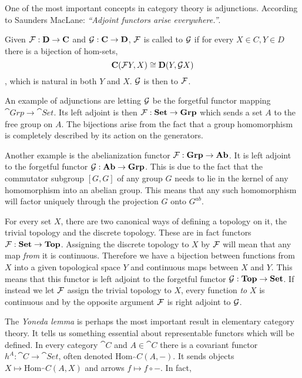\documentclass[../../main.tex]{subfiles}
\begin{document}
    One of the most important concepts in category theory is adjunctions. According to Saunders MacLane: \textit{“Adjoint functors arise everywhere.”}\cite{cate-mac}.
    
    \begin{definition}
        Given $\mathcal{F}: \mathbf{D} \to \mathbf{C}$ and $\mathcal{G}: \mathbf{C} \to \mathbf{D}$, $\mathcal{F}$ is called  to $\mathcal{G}$ if for every $X \in C, Y \in D$ there is a bijection of hom-sets, $$\mathbf{C}(\mathcal{F}Y, X) \cong \mathbf{D}(Y, \mathcal{G}X)$$, which is natural in both $Y$ and $X$. $\mathcal{G}$ is then  to $\mathcal{F}$.
    \end{definition}
    
    An example of adjunctions are letting $\mathcal{G}$ be the forgetful functor mapping $\cat{Grp} \to \cat{Set}$. Its left adjoint is then $\mathcal{F}: \mathbf{Set} \to \mathbf{Grp}$ which sends a set $A$ to the free group on $A$. The bijections arise from the fact that a group homomorphism is completely described by its action on the generators.
    
    Another example is the abelianization functor $\mathcal{F}: \mathbf{Grp} \to \mathbf{Ab}$. It is left adjoint to the forgetful functor $\mathcal{G}: \mathbf{Ab} \to \mathbf{Grp}$. This is due to the fact that the commutator subgroup $[G, G]$ of any group $G$ needs to lie in the kernel of any homomorphism into an abelian group. This means that any such homomorphism will factor uniquely through the projection $G$ onto $G^{ab}$.
    
    For every set $X$, there are two canonical ways of defining a topology on it, the trivial topology and the discrete topology. These are in fact functors $\mathcal{F}: \mathbf{Set} \to \mathbf{Top}$. Assigning the discrete topology to $X$ by $\mathcal{F}$ will mean that any map \emph{from} it is continuous. Therefore we have a bijection between functions from $X$ into a given topological space $Y$ and continuous maps between $X$ and $Y$. This means that this functor is left adjoint to the forgetful functor $\mathcal{G}: \mathbf{Top} \to \mathbf{Set}$. If instead we let $\mathcal{F}$ assign the trivial topology to $X$, every function \emph{to} $X$ is continuous and by the opposite argument $\mathcal{F}$ is right adjoint to $\mathcal{G}$.
    
    The \emph{Yoneda lemma} is perhaps the most important result in elementary category theory. It tells us something essential about representable functors which will be defined. In every category $\cat{C}$ and $A \in \cat{C}$ there is a covariant functor $h^A: \cat{C} \to \cat{Set}$, often denoted $\mathrm{Hom}_\cat{C}(A, -)$. It sends objects $X \mapsto \mathrm{Hom}_\cat{C}(A, X)$ and arrows $f \mapsto f \circ -$. In fact, 
    
\end{document}
